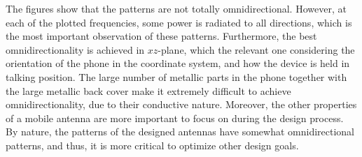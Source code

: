 The figures show that the patterns are not totally omnidirectional. However, at each of the plotted frequencies, some power is radiated to all directions, which is the most important observation of these patterns. Furthermore, the best omnidirectionality is achieved in $xz$-plane, which the relevant one considering the orientation of the phone in the coordinate system, and how the device is held in talking position. The large number of metallic parts in the phone together with the large metallic back cover make it extremely difficult to achieve omnidirectionality, due to their conductive nature. Moreover, the other properties of a mobile antenna are more important to focus on during the design process. By nature, the patterns of the designed antennas have somewhat omnidirectional patterns, and thus, it is more critical to optimize other design goals.
\clearpage
